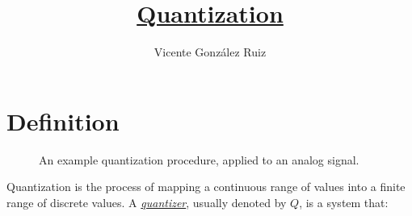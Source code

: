 
\title{\href{https://github.com/vicente-gonzalez-ruiz/quantization}{Quantization}}

\author{Vicente González Ruiz}

\maketitle
\tableofcontents

\section{Definition}

\begin{figure}
  \caption{An example quantization procedure, applied to an analog
    signal.}
  \label{fig:cuantif}
\end{figure}

Quantization is the process of mapping a continuous range of values
into a finite range of discrete values. A
\href{https://en.wikipedia.org/wiki/Quantization_(signal_processing)}{\emph{quantizer}},
usually denoted by $Q$, is a system that:


